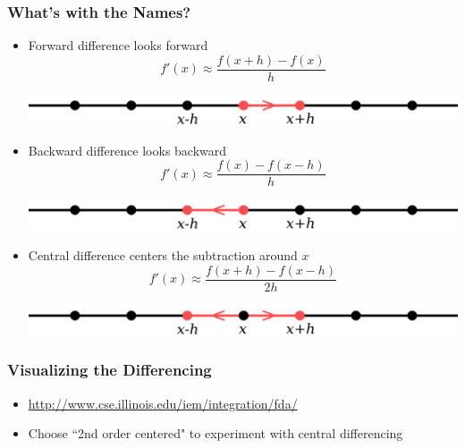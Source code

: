 \documentclass[10pt]{beamer}
\begin{document}
\begin{frame}
\frametitle{What's with the Names?}
\begin{itemize}
    \item Forward difference looks forward
          \[f'(x) \approx \frac{f(x+h) - f(x)}{h}\]
          \vspace{-18pt}
          \begin{center}
          \includegraphics[scale=0.23]{./figs/forwarddiff.png}
          \end{center}
    \item<2-> Backward difference looks backward
          \[f'(x) \approx \frac{f(x) - f(x-h)}{h}\]
          \vspace{-18pt}
          \begin{center}
          \includegraphics[scale=0.23]{./figs/backwarddiff.png}
          \end{center}
    \item<3-> Central difference centers the subtraction around $x$
          \[f'(x) \approx \frac{f(x+h) - f(x-h)}{2 h}\]
          \vspace{-18pt}
          \begin{center}
          \includegraphics[scale=0.23]{./figs/centraldiff.png}
          \end{center}
\end{itemize}
\end{frame}
\begin{frame}
\frametitle{Visualizing the Differencing}
\begin{itemize}
    \item \url{http://www.cse.illinois.edu/iem/integration/fda/}
    \item Choose ``2nd order centered" to experiment with central differencing
\end{itemize}
\end{frame}
\end{document}
